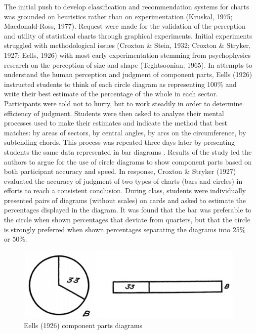 \documentclass[print]{nuthesis}
\begin{document}
The initial push to develop classification and recommendation systems for charts was grounded on heuristics rather than on experimentation (Kruskal, 1975; Macdonald-Ross, 1977).
Request were made for the validation of the perception and utility of statistical charts through graphical experiments.
Initial experiments struggled with methodological issues (Croxton \& Stein, 1932; Croxton \& Stryker, 1927; Eells, 1926) with most early experimentation stemming from psychophysics research on the perception of size and shape (Teghtsoonian, 1965).
In attempts to understand the human perception and judgment of component parts, Eells (1926) instructed students to think of each circle diagram  as representing 100\% and write their best estimate of the percentage of the whole in each sector.
Participants were told not to hurry, but to work steadily in order to determine efficiency of judgment.
Students were then asked to analyze their mental processes used to make their estimates and indicate the method that best matches: by areas of sectors, by central angles, by arcs on the circumference, by subtending chords.
This process was repeated three days later by presenting students the same data represented in bar diagrams .
Results of the study led the authors to argue for the use of circle diagrams to show component parts based on both participant accuracy and speed.
In response, Croxton \& Stryker (1927) evaluated the accuracy of judgment of two types of charts (bars and circles) in efforts to reach a consistent conclusion.
During class, students were individually presented pairs of diagrams (without scales) on cards and asked to estimate the percentages displayed in the diagram.
It was found that the bar was preferable to the circle when shown percentages that deviate from quarters, but that the circle is strongly preferred when shown percentages separating the diagrams into 25\% or 50\%.

\begin{figure}[tbp]

{\centering \includegraphics[width=0.75\linewidth,]{images/eells-component-parts} 

}

\caption{Eells (1926) component parts diagrams}\label{fig:eells-compoment-parts}
\end{figure}
\end{document}
